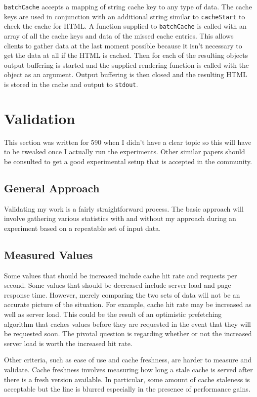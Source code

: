 \documentclass[12pt]{ucthesis}
\begin{document}
{\tt batchCache} accepts a mapping of string cache key to any type of data.
The cache keys are used in conjunction with an additional string similar to {\tt cacheStart} to check the cache for HTML.
A function supplied to {\tt batchCache} is called with an array of all the cache keys and data of the missed cache entries.
This allows clients to gather data at the last moment possible because it isn't necessary to get the data at all if the HTML is cached.
Then for each of the resulting objects output buffering is started and the supplied rendering function is called with the object as an argument.
Output buffering is then closed and the resulting HTML is stored in the cache and output to {\tt stdout}.


\chapter{Validation}
\label{validation}
This section was written for 590 when I didn't have a clear topic so this will have to be tweaked once I actually run the experiments.
Other similar papers should be consulted to get a good experimental setup that is accepted in the community.

\section{General Approach}
Validating my work is a fairly straightforward process.
The basic approach will involve gathering various statistics with and without my approach during an experiment based on a repeatable set of input data. %

\section{Measured Values}
Some values that should be increased include cache hit rate and requests per second.
Some values that should be decreased include server load and page response time.
However, merely comparing the two sets of data will not be an accurate picture of the situation.
For example, cache hit rate may be increased as well as server load.
This could be the result of an optimistic prefetching algorithm that caches values before they are requested in the event that they will be requested soon.
The pivotal question is regarding whether or not the increased server load is worth the increased hit rate.

Other criteria, such as ease of use and cache freshness, are harder to measure and validate.
Cache freshness involves measuring how long a stale cache is served after there is a fresh version available.
In particular, some amount of cache staleness is acceptable but the line is blurred especially in the presence of performance gains.
\end{document}
